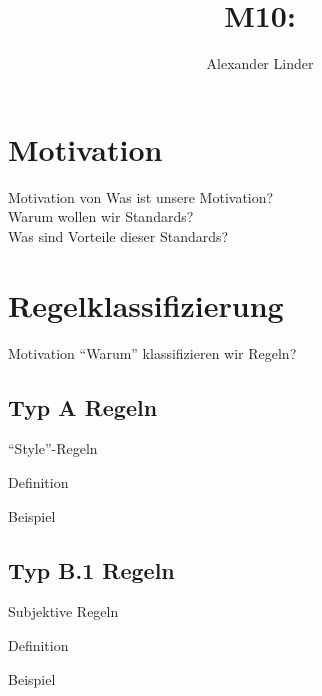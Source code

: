 \documentclass{beamer}
\title{M10: \sqss}
\author{Alexander Linder}
\date{} %
\begin{document}

    \begin{frame}
        \maketitle
    \end{frame}

    \begin{frame}
        \tableofcontents
    \end{frame}

    \section{Motivation}
    \label{sec:motivation}
    \begin{frame}{Motivation von \sqss}
        Was ist unsere Motivation?\\
        Warum wollen wir Standards?\\
        Was sind Vorteile dieser Standards?
    \end{frame}

    \section{Regelklassifizierung}
    \label{sec:regelklassifizierung}
    \begin{frame}{Motivation}
        \enquote{Warum} klassifizieren wir Regeln?
    \end{frame}

    \subsection{Typ A Regeln}
    \label{subsec:typ-a-regeln}
    \begin{frame}{\enquote{Style}-Regeln}
        \begin{block}{Definition}

        \end{block}
        \begin{exampleblock}{Beispiel}
            
        \end{exampleblock}
    \end{frame}

    \subsection{Typ B.1 Regeln}
    \label{subsec:typ-b-1-regeln}
    \begin{frame}{Subjektive Regeln}
        \begin{block}{Definition}

        \end{block}
        \begin{exampleblock}{Beispiel}
            
        \end{exampleblock}
    \end{frame}
\end{document}
